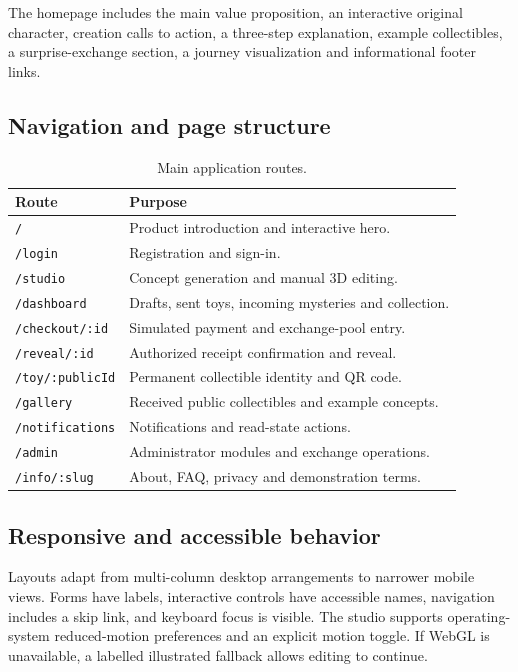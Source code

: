 \documentclass[11pt,a4paper]{article}
\begin{document}
The homepage includes the main value proposition, an interactive original character, creation calls to action, a three-step explanation, example collectibles, a surprise-exchange section, a journey visualization and informational footer links.

\subsection{Navigation and page structure}
\begin{table}[htbp]
\centering\small
\begin{tabularx}{\textwidth}{p{4cm}Y}
\toprule
\textbf{Route} & \textbf{Purpose}\\
\midrule
\texttt{/} & Product introduction and interactive hero.\\
\texttt{/login} & Registration and sign-in.\\
\texttt{/studio} & Concept generation and manual 3D editing.\\
\texttt{/dashboard} & Drafts, sent toys, incoming mysteries and collection.\\
\texttt{/checkout/:id} & Simulated payment and exchange-pool entry.\\
\texttt{/reveal/:id} & Authorized receipt confirmation and reveal.\\
\texttt{/toy/:publicId} & Permanent collectible identity and QR code.\\
\texttt{/gallery} & Received public collectibles and example concepts.\\
\texttt{/notifications} & Notifications and read-state actions.\\
\texttt{/admin} & Administrator modules and exchange operations.\\
\texttt{/info/:slug} & About, FAQ, privacy and demonstration terms.\\
\bottomrule
\end{tabularx}
\caption{Main application routes.}
\end{table}

\subsection{Responsive and accessible behavior}
Layouts adapt from multi-column desktop arrangements to narrower mobile views. Forms have labels, interactive controls have accessible names, navigation includes a skip link, and keyboard focus is visible. The studio supports operating-system reduced-motion preferences and an explicit motion toggle. If WebGL is unavailable, a labelled illustrated fallback allows editing to continue.
\end{document}
